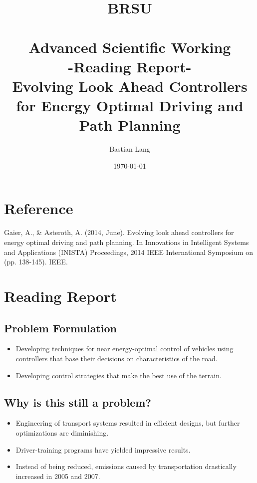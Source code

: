 \documentclass[paper=a4, fontsize=11pt]{scrartcl} %
\title{	
\normalfont \normalsize 
\textsc{BRSU} \\ [25pt] %
\horrule{0.5pt} \\[0.4cm] %
\huge Advanced Scientific Working\\-Reading Report-\\
Evolving Look Ahead Controllers for Energy Optimal Driving and Path Planning %
\horrule{2pt} \\[0.5cm] %
}
\author{Bastian Lang} %
\date{\normalsize\today} %
\numberwithin{equation}{section} %
\numberwithin{figure}{section} %
\numberwithin{table}{section} %
\begin{document}
\maketitle %

\newpage

\section{Reference}
Gaier, A., \& Asteroth, A. (2014, June). Evolving look ahead controllers for energy optimal driving and path planning. In Innovations in Intelligent Systems and Applications (INISTA) Proceedings, 2014 IEEE International Symposium on (pp. 138-145). IEEE.

\section{Reading Report}
\subsection{Problem Formulation}
\begin{itemize}
	\item Developing techniques for near energy-optimal control of vehicles using controllers that base their decisions on characteristics of the road.
	\item Developing control strategies that make the best use of the terrain.
\end{itemize}

\subsection{Why is this still a problem?}
\begin{itemize}
	\item Engineering of transport systems resulted in efficient designs, but further optimizations are diminishing.
	\item Driver-training programs have yielded impressive results.
	\item Instead of being reduced, emissions caused by transportation drastically increased in 2005 and 2007.
\end{itemize}
\end{document}
